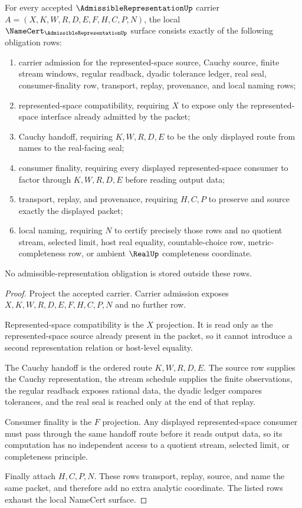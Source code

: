 \begin{theorem}
\label{thm:admissible-representation-namecert-obligations}
For every accepted $\AdmissibleRepresentationUp$ carrier $A=(X,K,W,R,D,E,F,H,C,P,N)$, the local $\NameCert_{\AdmissibleRepresentationUp}$ surface consists exactly of the following obligation rows:
\begin{enumerate}
\item carrier admission for the represented-space source, Cauchy source, finite stream windows, regular readback, dyadic tolerance ledger, real seal, consumer-finality row, transport, replay, provenance, and local naming rows;
\item represented-space compatibility, requiring $X$ to expose only the represented-space interface already admitted by the packet;
\item Cauchy handoff, requiring $K,W,R,D,E$ to be the only displayed route from names to the real-facing seal;
\item consumer finality, requiring every displayed represented-space consumer to factor through $K,W,R,D,E$ before reading output data;
\item transport, replay, and provenance, requiring $H,C,P$ to preserve and source exactly the displayed packet;
\item local naming, requiring $N$ to certify precisely those rows and no quotient stream, selected limit, host real equality, countable-choice row, metric-completeness row, or ambient $\RealUp$ completeness coordinate.
\end{enumerate}
No admissible-representation obligation is stored outside these rows.
\end{theorem}
\begin{proof}
Project the accepted carrier. Carrier admission exposes $X,K,W,R,D,E,F,H,C,P,N$ and no further row.

Represented-space compatibility is the $X$ projection. It is read only as the represented-space source already present in the packet, so it cannot introduce a second representation relation or host-level equality.

The Cauchy handoff is the ordered route $K,W,R,D,E$. The source row supplies the Cauchy representation, the stream schedule supplies the finite observations, the regular readback exposes rational data, the dyadic ledger compares tolerances, and the real seal is reached only at the end of that replay.

Consumer finality is the $F$ projection. Any displayed represented-space consumer must pass through the same handoff route before it reads output data, so its computation has no independent access to a quotient stream, selected limit, or completeness principle.

Finally attach $H,C,P,N$. These rows transport, replay, source, and name the same packet, and therefore add no extra analytic coordinate. The listed rows exhaust the local NameCert surface.
\end{proof}

